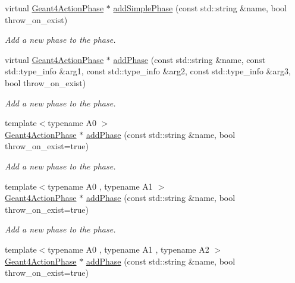 \begin{DoxyCompactItemize}
virtual \hyperlink{class_d_d4hep_1_1_simulation_1_1_geant4_action_phase}{Geant4ActionPhase} $\ast$ \hyperlink{class_d_d4hep_1_1_simulation_1_1_geant4_kernel_ad6e24016ebe31a06417ffac7f6e93818}{addSimplePhase} (const std::string \&name, bool throw\_\-on\_\-exist)
\begin{DoxyCompactList}\small\item\em Add a new phase to the phase. \item\end{DoxyCompactList}\item 
virtual \hyperlink{class_d_d4hep_1_1_simulation_1_1_geant4_action_phase}{Geant4ActionPhase} $\ast$ \hyperlink{class_d_d4hep_1_1_simulation_1_1_geant4_kernel_a7b04d88f6257e121268032dfe2bdc2d4}{addPhase} (const std::string \&name, const std::type\_\-info \&arg1, const std::type\_\-info \&arg2, const std::type\_\-info \&arg3, bool throw\_\-on\_\-exist)
\begin{DoxyCompactList}\small\item\em Add a new phase to the phase. \item\end{DoxyCompactList}\item 
{\footnotesize template$<$typename A0 $>$ }\\\hyperlink{class_d_d4hep_1_1_simulation_1_1_geant4_action_phase}{Geant4ActionPhase} $\ast$ \hyperlink{class_d_d4hep_1_1_simulation_1_1_geant4_kernel_a3f0e8487909e620f5d7a74153c4aa418}{addPhase} (const std::string \&name, bool throw\_\-on\_\-exist=true)
\begin{DoxyCompactList}\small\item\em Add a new phase to the phase. \item\end{DoxyCompactList}\item 
{\footnotesize template$<$typename A0 , typename A1 $>$ }\\\hyperlink{class_d_d4hep_1_1_simulation_1_1_geant4_action_phase}{Geant4ActionPhase} $\ast$ \hyperlink{class_d_d4hep_1_1_simulation_1_1_geant4_kernel_a3f0e8487909e620f5d7a74153c4aa418}{addPhase} (const std::string \&name, bool throw\_\-on\_\-exist=true)
\begin{DoxyCompactList}\small\item\em Add a new phase to the phase. \item\end{DoxyCompactList}\item 
{\footnotesize template$<$typename A0 , typename A1 , typename A2 $>$ }\\\hyperlink{class_d_d4hep_1_1_simulation_1_1_geant4_action_phase}{Geant4ActionPhase} $\ast$ \hyperlink{class_d_d4hep_1_1_simulation_1_1_geant4_kernel_a3f0e8487909e620f5d7a74153c4aa418}{addPhase} (const std::string \&name, bool throw\_\-on\_\-exist=true)

\end{DoxyCompactItemize}
